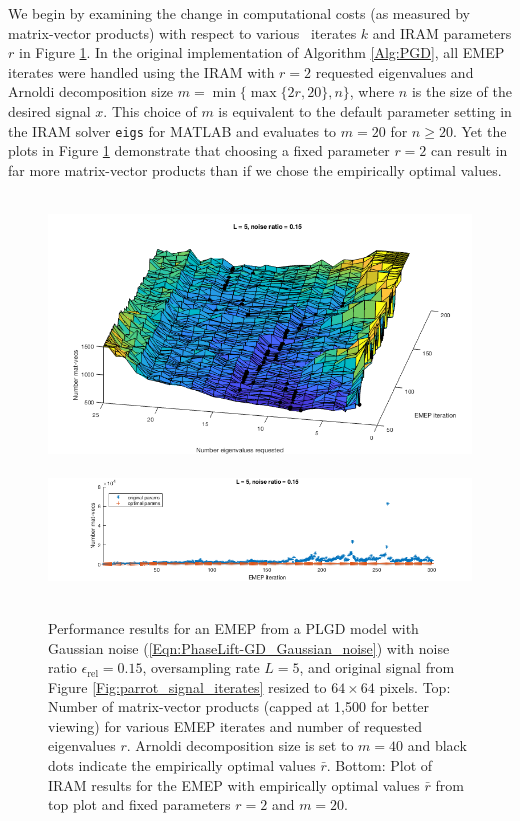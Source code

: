 We begin by examining the change in computational costs  (as measured by matrix-vector products) with respect to various \emep \ iterates $k$ and IRAM parameters $r$ in Figure \ref{Fig:Numerics-num_matvecs_orig_vs_optimal_params}.
In the original implementation of Algorithm \ref{Alg:PGD}, all EMEP iterates were handled using the IRAM with $r=2$ requested eigenvalues and Arnoldi decomposition size $m = \min \{  \max \{ 2r, 20 \}, n \}$, where $n$ is the size of the desired signal $x$.  
This choice of $m$ is equivalent to the default parameter setting in the IRAM solver \texttt{eigs} for MATLAB and evaluates to $m=20$ for $n \geq 20$.
Yet the plots in Figure \ref{Fig:Numerics-num_matvecs_orig_vs_optimal_params} demonstrate that choosing a fixed parameter $r=2$ can result in far more matrix-vector products than if we chose the empirically optimal values.


\begin{figure}[H]
\centering
\hbox{\hspace{-0.2cm} \includegraphics[scale=0.6]{Numerics-num_matvecs_orig_vs_optimal_params_1} }\vspace{1.0cm}
\hbox{\hspace{-0.8cm} \includegraphics[scale=0.6]{Numerics-num_matvecs_orig_vs_optimal_params_2} }\vspace{0.0cm}
	\caption{
Performance results for an EMEP from a PLGD model with Gaussian noise	(\ref{Eqn:PhaseLift-GD_Gaussian_noise}) with noise ratio $\epsilon_\text{rel} = 0.15$, oversampling rate $L = 5$, and original signal from Figure \ref{Fig:parrot_signal_iterates} resized to $64 \times 64$ pixels.
Top: Number of matrix-vector products (capped at 1,500 for better viewing) for various EMEP iterates and number of requested eigenvalues $r$.  
Arnoldi decomposition size is set to $m = 40$ and black dots indicate the empirically optimal values $\bar{r}$.
Bottom: Plot of IRAM results for the EMEP with empirically optimal values $\bar{r}$ from top plot and fixed parameters $r=2$ and $m=20$.
	}
\label{Fig:Numerics-num_matvecs_orig_vs_optimal_params}
\end{figure}




